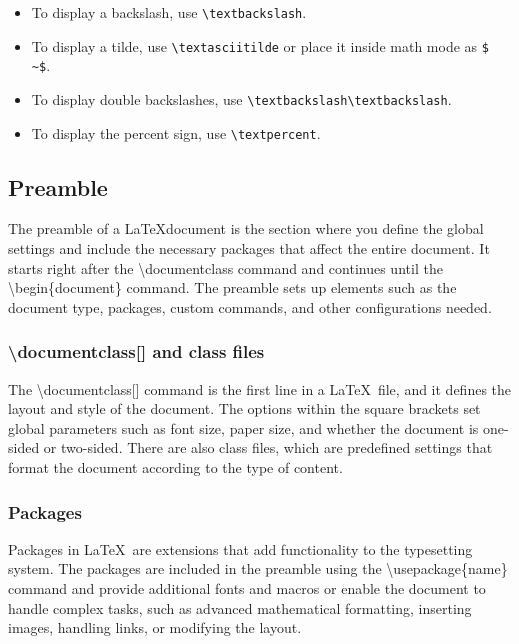 \documentclass[12pt,journal,compsoc]{IEEEtran}
\begin{document}
\begin{itemize}
    \item To display a backslash, use \texttt{\textbackslash textbackslash}.
    \item To display a tilde, use \texttt{\textbackslash textasciitilde} or place it inside math mode as \texttt{\$ \textasciitilde \$}.
    \item To display double backslashes, use \texttt{\textbackslash textbackslash\textbackslash textbackslash}.
    \item To display the percent sign, use \texttt{\textbackslash textpercent}.
\end{itemize}

\subsection{Preamble}
The preamble of a \LaTeX document is the section where you define the global settings and include the necessary packages that affect the entire document. It starts right after the \textbackslash documentclass command and continues until the \textbackslash begin\{document\} command. The preamble sets up elements such as the document type, packages, custom commands, and other configurations needed.

\subsubsection{\textbackslash documentclass[] and class files}
The \textbackslash documentclass[] command is the first line in a \LaTeX\ file, and it defines the layout and style of the document. The options within the square brackets set global parameters such as font size, paper size, and whether the document is one-sided or two-sided. There are also class files, which are predefined settings that format the document according to the type of content. 

\subsubsection{Packages}

Packages in \LaTeX\ are extensions that add functionality to the typesetting system. The packages are included in the preamble using the \textbackslash usepackage\{name\} command and provide additional fonts and macros or enable the document to handle complex tasks, such as advanced mathematical formatting, inserting images, handling links, or modifying the layout. 
\end{document}
